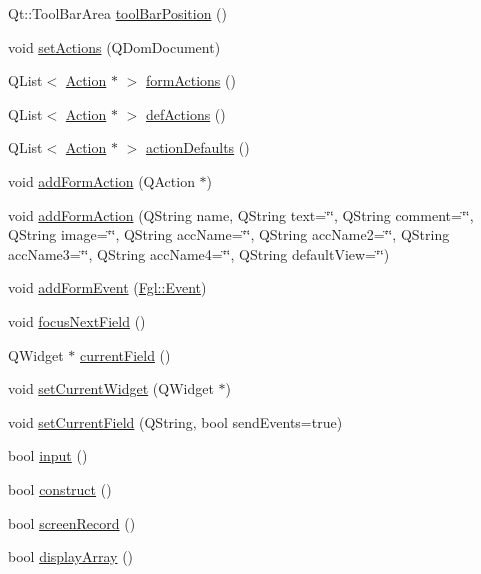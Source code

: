\begin{DoxyCompactItemize}
\item 
Qt::ToolBarArea \hyperlink{classFglForm_acca25b6cbf4161c7075fb594a556eb9a}{toolBarPosition} ()
\item 
void \hyperlink{classFglForm_a4b9c2e9963530fba9dc68f9dae0928a0}{setActions} (QDomDocument)
\item 
QList$<$ \hyperlink{classAction}{Action} $\ast$ $>$ \hyperlink{classFglForm_ac8a66ae6b84ca24c622a87eb631a4834}{formActions} ()
\item 
QList$<$ \hyperlink{classAction}{Action} $\ast$ $>$ \hyperlink{classFglForm_a1a92c94c67dd0ff9d8ff48c3fc64dcf9}{defActions} ()
\item 
QList$<$ \hyperlink{classAction}{Action} $\ast$ $>$ \hyperlink{classFglForm_aa65ef0a575b40217c5fbbe71c6faaf28}{actionDefaults} ()
\item 
void \hyperlink{classFglForm_ac43c7da12a298a241c7c98cf9a688a6f}{addFormAction} (QAction $\ast$)
\item 
void \hyperlink{classFglForm_a21e61578024f5922c949b4c2870684d4}{addFormAction} (QString name, QString text=\char`\"{}\char`\"{}, QString comment=\char`\"{}\char`\"{}, QString image=\char`\"{}\char`\"{}, QString accName=\char`\"{}\char`\"{}, QString accName2=\char`\"{}\char`\"{}, QString accName3=\char`\"{}\char`\"{}, QString accName4=\char`\"{}\char`\"{}, QString defaultView=\char`\"{}\char`\"{})
\item 
void \hyperlink{classFglForm_abadbd33d56f9bc46b3421f8fe0628952}{addFormEvent} (\hyperlink{structFgl_1_1Event}{Fgl::Event})
\item 
void \hyperlink{classFglForm_a5f3fea57cf46e7d548912efdaffa35f9}{focusNextField} ()
\item 
QWidget $\ast$ \hyperlink{classFglForm_a74cb6310512352e1fd501efbcd88724b}{currentField} ()
\item 
void \hyperlink{classFglForm_ac521356370affcf115340e2279475c6b}{setCurrentWidget} (QWidget $\ast$)
\item 
void \hyperlink{classFglForm_a4574756e714c6d93e6d177ecbfb78ae1}{setCurrentField} (QString, bool sendEvents=true)
\item 
bool \hyperlink{classFglForm_ab6b474ce22c93c45ccbee4b637647732}{input} ()
\item 
bool \hyperlink{classFglForm_ab131183405b70a2d48643ec9a522f877}{construct} ()
\item 
bool \hyperlink{classFglForm_a2e45f9d338ef208ffb1c08f1f97e6b2b}{screenRecord} ()
\item 
bool \hyperlink{classFglForm_a77b1a70cf1fff7d103b8c1895b3302c4}{displayArray} ()

\end{DoxyCompactItemize}
